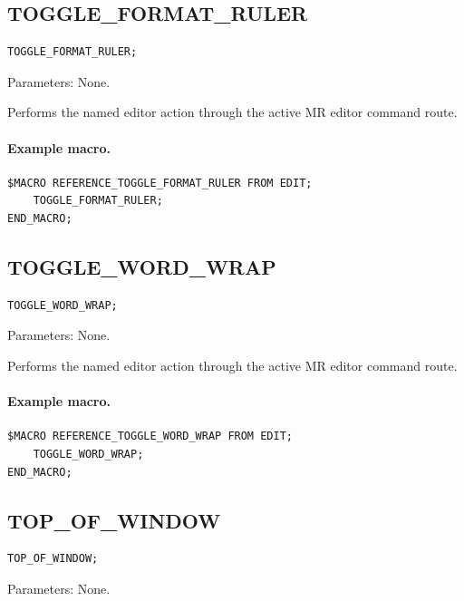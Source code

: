 \documentclass[a4paper,10pt,twoside,openany]{book}
\newenvironment{mrmacextension}{\begin{changebar}}{\end{changebar}}
\begin{document}
\begin{mrmacextension}
\label{prim:procedure-toggle-format-ruler}
\subsection*{TOGGLE\_FORMAT\_RULER}
\begin{verbatim}
TOGGLE_FORMAT_RULER;
\end{verbatim}
Parameters: None.

Performs the named editor action through the active MR editor command route.

\paragraph{Example macro.}
\begin{verbatim}
$MACRO REFERENCE_TOGGLE_FORMAT_RULER FROM EDIT;
    TOGGLE_FORMAT_RULER;
END_MACRO;
\end{verbatim}
\end{mrmacextension}

\begin{mrmacextension}
\label{prim:procedure-toggle-word-wrap}
\subsection*{TOGGLE\_WORD\_WRAP}
\begin{verbatim}
TOGGLE_WORD_WRAP;
\end{verbatim}
Parameters: None.

Performs the named editor action through the active MR editor command route.

\paragraph{Example macro.}
\begin{verbatim}
$MACRO REFERENCE_TOGGLE_WORD_WRAP FROM EDIT;
    TOGGLE_WORD_WRAP;
END_MACRO;
\end{verbatim}
\end{mrmacextension}

\label{prim:procedure-top-of-window}
\subsection*{TOP\_OF\_WINDOW}
\begin{verbatim}
TOP_OF_WINDOW;
\end{verbatim}
Parameters: None.
\end{document}
